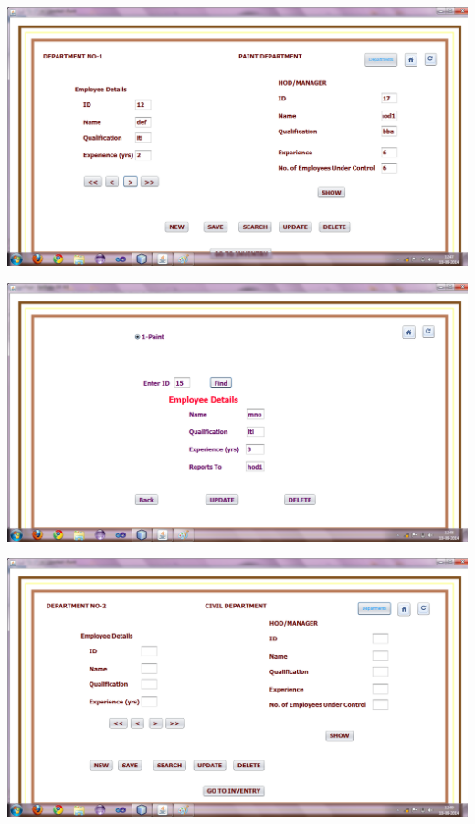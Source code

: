 \documentclass[12pt,a4paper]{report}
\begin{document}
\begin{center}
\includegraphics[scale=0.45]{14.png}
\end{center}
\begin{center}
\includegraphics[scale=0.45]{15.png}
\end{center}
\begin{center}
\includegraphics[scale=0.45]{17.png}
\end{center}
\end{document}
